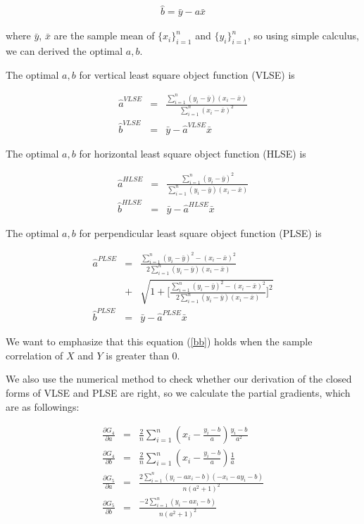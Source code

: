 \documentclass[twoside]{article}
\begin{document}
\begin{eqnarray}
\label{optb}
\hat{b} = \bar{y} - a \bar{x}
\end{eqnarray}

where $\bar{y}$, $\bar{x}$ are the sample mean of $\{x_i\}_{i=1}^n$ and $\{y_i\}_{i=1}^n$, so using simple calculus, we can derived the optimal $a, b$.

The optimal $a, b$ for vertical least square object function (VLSE) is

\begin{eqnarray}
  \hat{a}^{VLSE} &=& \frac{\sum_{i=1}^n{(y_i-\bar{y})(x_i-\bar{x})}}{\sum_{i=1}^n{(x_i-\bar{x})^2}} \\
  \hat{b}^{VLSE} &=& \bar{y} - \hat{a}^{VLSE} \bar{x}
\end{eqnarray}

The optimal $a, b$ for horizontal least square object function (HLSE) is

\begin{eqnarray}
  \hat{a}^{HLSE} &=& \frac{\sum_{i=1}^n{(y_i-\bar{y})^2}}{\sum_{i=1}^n{(y_i-\bar{y})(x_i-\bar{x})}} \\
  \hat{b}^{HLSE} &=& \bar{y} - \hat{a}^{HLSE} \bar{x}
\end{eqnarray}

The optimal $a, b$ for perpendicular least square object function (PLSE) is 

\begin{eqnarray}
  \hat{a}^{PLSE} &=& \frac{\sum_{i=1}^n{(y_i-\bar{y})^2}-(x_i-\bar{x})^2}{2\sum_{i=1}^n{(y_i-\bar{y})(x_i-\bar{x})}} \nonumber \\ &+& \sqrt{1+\big[\frac{\sum_{i=1}^n{(y_i-\bar{y})^2}-(x_i-\bar{x})^2}{2\sum_{i=1}^n{(y_i-\bar{y})(x_i-\bar{x})}}\big]^2} \label{bb} \\
  \hat{b}^{PLSE} &=& \bar{y} - \hat{a}^{PLSE} \bar{x}
\end{eqnarray}

We want to emphasize that this equation (\ref{bb}) holds when the sample correlation of $X$ and $Y$ is greater than 0.

We also use the numerical method to check whether our derivation of the closed forms of VLSE and PLSE are right, so we calculate the partial gradients, which are as followings:

\begin{eqnarray}
  \frac{\partial G_4}{\partial a}&=&\frac{2}{n}\sum_{i=1}^n{(x_i-\frac{y_i-b}{a})\frac{y_i-b}{a^2}} \\
  \frac{\partial G_4}{\partial b}&=&\frac{2}{n}\sum_{i=1}^n{(x_i-\frac{y_i-b}{a})\frac{1}{a}} \\
  \frac{\partial G_5}{\partial a}&=&\frac{2\sum_{i=1}^n{(y_i-a x_i-b)(-x_i-a y_i-b)}}{n(a^2+1)^2} \\
  \frac{\partial G_5}{\partial b}&=&\frac{-2\sum_{i=1}^n{(y_i-a x_i-b)}}{n(a^2+1)^2}
\end{eqnarray}
\end{document}
